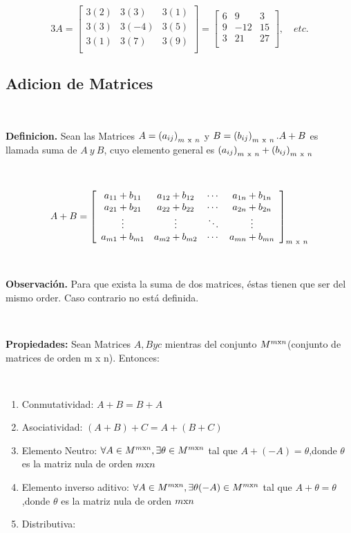 \documentclass[11pt, conference]{IEEEtran}
\begin{document}
{\

\[
	3A = \left[
    \begin{array}{ccc}
    3(2) & 3(3) & 3(1) \\
    3(3) & 3(-4) & 3(5) \\
    3(1) & 3(7) & 3(9) \\
    \end{array}
    \right]
     = \left[
    \begin{array}{ccc}
    6 & 9 & 3 \\
    9 & -12 & 15 \\
    3 & 21 & 27 \\
    \end{array}
    \right],\quad etc.
\]
\subsection{Adicion de Matrices}

\

\textbf{Definicion.} Sean las Matrices $A = \left(a_{ij}\right)_{m\ \textnormal{x}\ n}$ y $B = \left(b_{ij}\right)_{m\ \textnormal{x}\ n}. A + B$ es llamada suma de $A\ y\ B$, cuyo elemento general  es $\left(a_{ij}\right)_{m\ \textnormal{x}\ n} + \left(b_{ij}\right)_{m\ \textnormal{x}\ n}$

\

\[
	A+B = \left[
  \begin{array}{cccc}
  a_{11}+b_{11} & a_{12}+b_{12} & \cdots & a_{1n}+b_{1n} \\
  a_{21}+b_{21} & a_{22}+b_{22} & \cdots & a_{2n}+b_{2n} \\
  \vdots & \vdots &\ddots & \vdots \\
  a_{m1}+b_{m1} & a_{m2}+b_{m2} & \cdots & a_{mn}+b_{mn} \\
  \end{array} \right]_{m\ \textnormal{x}\ n}
\]

\

\begin{center}
	\textbf{Observación.} Para que exista la suma de dos matrices, éstas tienen que ser  del mismo order. Caso contrario no está definida.
\end{center}

\

\textbf{Propiedades:} Sean Matrices $A,B y c$ mientras del conjunto $
M^{m\textnormal{x}n}$(conjunto de matrices de orden m x n). Entonces:

\

\begin{enumerate}
	\item Conmutatividad: $A+B = B+A$
    \item Asociatividad: $(A+B)+C = A+(B+C)$
    \item Elemento Neutro: $\forall A \in M^{m\textnormal{x}n}, \exists\theta\in M^{m\textnormal{x}n}$ tal que  $A+(-A) = \theta$,donde $\theta$ es la matriz nula de orden $m\textnormal{x}n$
    \item Elemento inverso aditivo: $\forall A \in M^{m\textnormal{x}n}, \exists\theta(-A)\in M^{m\textnormal{x}n}$ tal que  $A+\theta = \theta$,donde $\theta$ es la matriz nula de orden $m\textnormal{x}n$
    \item Distributiva: 
    

\end{enumerate}}
\end{document}

